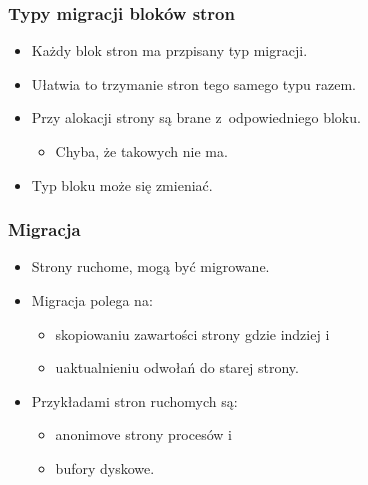 \begin{frame}[fragile]
  \frametitle{Typy migracji bloków stron}

  \begin{itemize}
  \item Każdy blok stron ma przpisany typ migracji.
  \item Ułatwia to trzymanie stron tego samego typu razem.
  \item Przy alokacji strony są brane z~odpowiedniego bloku.
    \begin{itemize}
    \item Chyba, że takowych nie ma.
    \end{itemize}
  \item Typ bloku może się zmieniać.
  \end{itemize}
\end{frame}

\begin{frame}[fragile]
  \frametitle{Migracja}

  \begin{itemize}
  \item Strony ruchome, mogą być migrowane.
  \item Migracja polega na:
    \begin{itemize}
    \item skopiowaniu zawartości strony gdzie indziej i
    \item uaktualnieniu odwołań do starej strony.
    \end{itemize}
  \item Przykładami stron ruchomych są:
    \begin{itemize}
    \item anonimove strony procesów i
    \item bufory dyskowe.
    \end{itemize}
  \end{itemize}
\end{frame}
